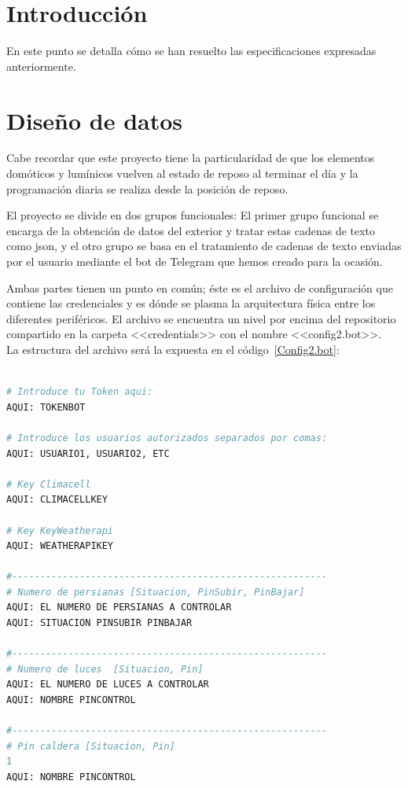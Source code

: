 \section{Introducción}
En este punto se detalla cómo se han resuelto las especificaciones expresadas anteriormente.
\section{Diseño de datos}

Cabe recordar que este proyecto tiene la particularidad de que los elementos domóticos y lumínicos vuelven al estado de reposo al terminar el día y la programación diaria se realiza desde la posición de reposo.

El proyecto se divide en dos grupos funcionales: 
El primer grupo funcional se encarga de la obtención de datos del exterior y tratar estas cadenas de texto como json, y el otro grupo se basa en el tratamiento de cadenas de texto enviadas por el usuario mediante el bot de Telegram que hemos creado para la ocasión.

Ambas partes tienen un punto en común; éste es el archivo de configuración que contiene las credenciales y es dónde se plasma la arquitectura física entre los diferentes periféricos. El archivo se encuentra un nivel por encima del repositorio compartido en la carpeta <<credentials>> con el nombre <<config2.bot>>.~\\

La estructura del archivo será la expuesta en el código~\ref{Config2.bot}:~\\~\\
\begin{lstlisting}[language=Python, caption={Estructura del archivo \texttt{config2.bot}}, basicstyle=\small, label={Config2.bot}]
# Introduce tu Token aqui:
AQUI: TOKENBOT

# Introduce los usuarios autorizados separados por comas:
AQUI: USUARIO1, USUARIO2, ETC

# Key Climacell
AQUI: CLIMACELLKEY

# Key KeyWeatherapi
AQUI: WEATHERAPIKEY

#--------------------------------------------------------
# Numero de persianas [Situacion, PinSubir, PinBajar]
AQUI: EL NUMERO DE PERSIANAS A CONTROLAR
AQUI: SITUACION PINSUBIR PINBAJAR

#--------------------------------------------------------
# Numero de luces  [Situacion, Pin]
AQUI: EL NUMERO DE LUCES A CONTROLAR
AQUI: NOMBRE PINCONTROL

#--------------------------------------------------------
# Pin caldera [Situacion, Pin]
1
AQUI: NOMBRE PINCONTROL
\end{lstlisting}


